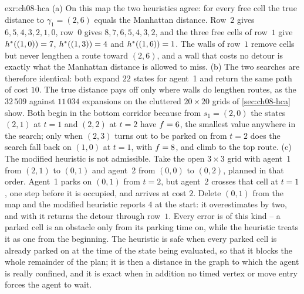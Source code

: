 \begin{solution}{exr:ch08-hca}
(a) On this map the two heuristics agree: for every free cell the true distance to $\gamma_1 = (2,6)$ equals the Manhattan distance. Row~$2$ gives $6, 5, 4, 3, 2, 1, 0$, row~$0$ gives $8, 7, 6, 5, 4, 3, 2$, and the three free cells of row~$1$ give $h^*((1,0)) = 7$, $h^*((1,3)) = 4$ and $h^*((1,6)) = 1$. The walls of row~$1$ remove cells but never lengthen a route toward $(2,6)$, and a wall that costs no detour is exactly what the Manhattan distance is allowed to miss. (b) The two searches are therefore identical: both expand $22$ states for agent~1 and return the same path of cost $10$. The true distance pays off only where walls do lengthen routes, as the $32\,509$ against $11\,034$ expansions on the cluttered $20 \times 20$ grids of \cref{sec:ch08-hca} show. Both begin in the bottom corridor because from $s_1 = (2,0)$ the states $(2,1)$ at $t = 1$ and $(2,2)$ at $t = 2$ have $f = 6$, the smallest value anywhere in the search; only when $(2,3)$ turns out to be parked on from $t = 2$ does the search fall back on $(1,0)$ at $t = 1$, with $f = 8$, and climb to the top route. (c) The modified heuristic is not admissible. Take the open $3 \times 3$ grid with agent~1 from $(2,1)$ to $(0,1)$ and agent~2 from $(0,0)$ to $(0,2)$, planned in that order. Agent~1 parks on $(0,1)$ from $t = 2$, but agent~2 crosses that cell at $t = 1$, one step before it is occupied, and arrives at cost $2$. Delete $(0,1)$ from the map and the modified heuristic reports $4$ at the start: it overestimates by two, and \astar with it returns the detour through row~$1$. Every error is of this kind -- a parked cell is an obstacle only from its parking time on, while the heuristic treats it as one from the beginning. The heuristic is safe when every parked cell is already parked on at the time of the state being evaluated, so that it blocks the whole remainder of the plan; it is then a distance in the graph to which the agent is really confined, and it is exact when in addition no timed vertex or move entry forces the agent to wait.
\end{solution}


